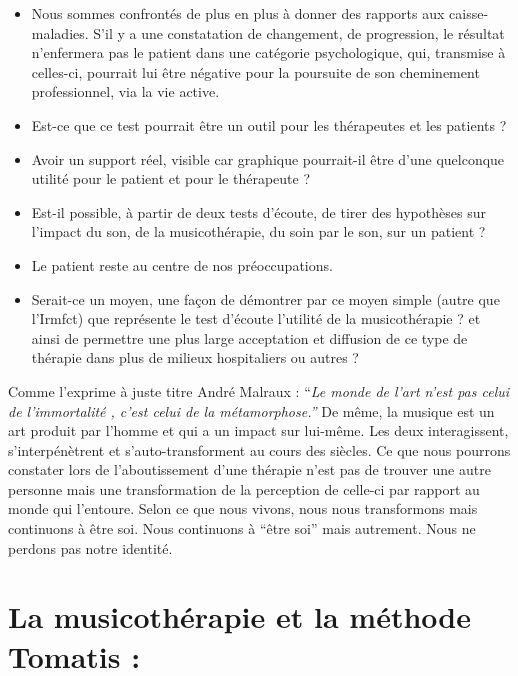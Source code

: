 \begin{itemize}
\item Nous sommes confrontés de plus en plus à donner des rapports aux caisse-maladies.
S'il y a une constatation de changement, de progression, le résultat
n'enfermera pas le patient dans une catégorie psychologique, qui,
transmise à celles-ci, pourrait lui être négative pour la poursuite
de son cheminement professionnel, via la vie active. 
\item Est-ce que ce test pourrait être un outil pour les thérapeutes et
les patients ? 
\item Avoir un support réel, visible car graphique pourrait-il être d'une
quelconque utilité pour le patient et pour le thérapeute ?
\item Est-il possible, à partir de deux tests d'écoute, de tirer des hypothèses
sur l'impact du son, de la musicothérapie, du soin par le son, sur
un patient ?
\item Le patient reste au centre de nos préoccupations.
\item Serait-ce un moyen, une façon de démontrer par ce moyen simple (autre
que l'Irmfct) que représente le test d'écoute l'utilité de la musicothérapie
? et ainsi de permettre une plus large acceptation et diffusion de
ce type de thérapie dans plus de milieux hospitaliers ou autres ?
\end{itemize}

Comme l'exprime à juste titre André Malraux : ``\emph{Le monde de
	l'art n'est pas celui de l'immortalité , c'est celui de la métamorphose.''}
De même, la musique est un art produit par l'homme et qui a un impact
sur lui-même. Les deux interagissent, s'interpénètrent et s'auto-transforment
au cours des siècles. Ce que nous pourrons constater lors de l'aboutissement
d'une thérapie n'est pas de trouver une autre personne mais une transformation
de la perception de celle-ci par rapport au monde qui l'entoure. Selon
ce que nous vivons, nous nous transformons mais continuons à être
soi. Nous continuons à ``être soi'' mais autrement. Nous ne perdons
pas notre identité.

\section{La musicothérapie et la méthode Tomatis : }
